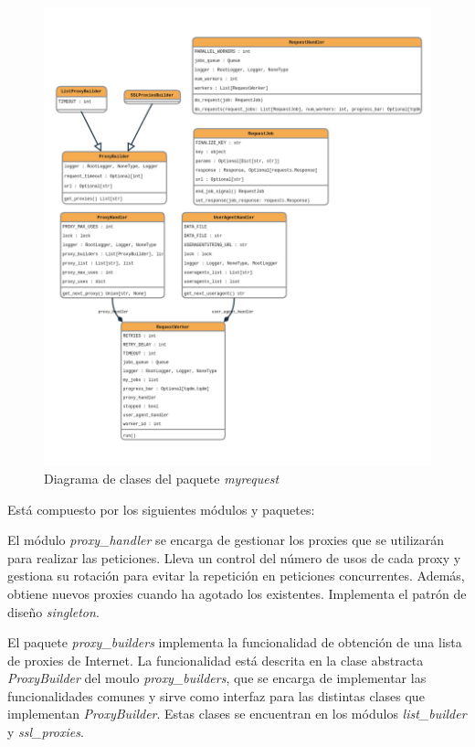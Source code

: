 \begin{figure}[h!]
    \centering
    \includegraphics[width=1\textwidth]{img/anexos/myrequests_classes.png}
    \caption{Diagrama de clases del paquete \textit{myrequest}}
    \label{fig:myrequest_classes}
\end{figure}



Está compuesto por los siguientes módulos y paquetes:

El módulo \textit{proxy\_handler} se encarga de gestionar los proxies que se utilizarán para
realizar las peticiones. Lleva un control del número de usos de cada proxy y gestiona su rotación
para evitar la repetición en peticiones concurrentes. Además, obtiene nuevos proxies cuando ha
agotado los existentes. Implementa el patrón de diseño \textit{singleton}.

El paquete \textit{proxy\_builders} implementa la funcionalidad de obtención de una lista de
proxies de Internet. La funcionalidad está descrita en la clase abstracta \textit{ProxyBuilder} del moulo \textit{proxy\_builders},
que se encarga de implementar las funcionalidades comunes y sirve como interfaz para las distintas
clases que implementan \textit{ProxyBuilder}. Estas clases se encuentran en los
módulos \textit{list\_builder} y \textit{ssl\_proxies}.


